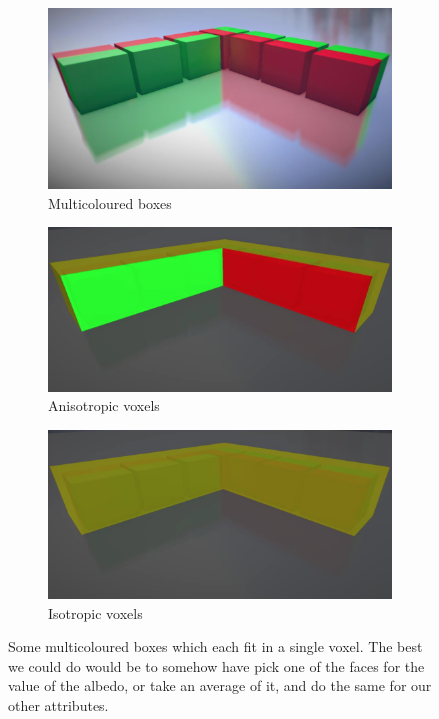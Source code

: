 \begin{figure}\label{f:vct-anisotropic-voxels-1}
	\begin{subfigure}[b]{0.314\textwidth}
		\includegraphics{graphics/vct/vct-11-2}
		\caption{Multicoloured boxes}
	\end{subfigure}
	\begin{subfigure}[b]{0.343\textwidth}
		\includegraphics{graphics/vct/vct-11-3}
		\caption{Anisotropic voxels}
	\end{subfigure}
	\begin{subfigure}[b]{0.336\textwidth}
		\includegraphics{graphics/vct/vct-11-4}
		\caption{Isotropic voxels}
	\end{subfigure}
	\caption{Some multicoloured boxes which each fit in a single voxel. The best we could do would be to somehow have pick one of the faces for the value of the albedo, or take an average of it, and do the same for our other attributes.}
\end{figure}

